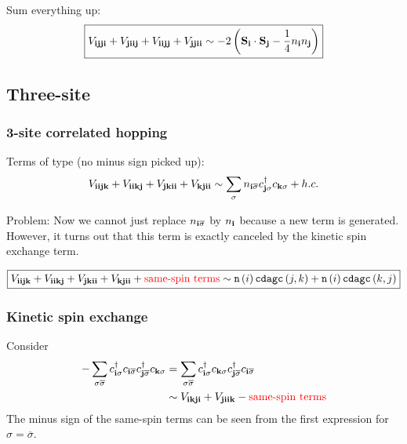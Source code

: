 \documentclass[12pt,paper=a4]{article}
\newcommand{\cs}[1]{c_{#1\sigma}}
\newcommand{\cdags}[1]{c^{\dagger}_{#1\sigma}}
\newcommand{\cS}[1]{c_{#1\overline{\sigma}}}
\newcommand{\cdagS}[1]{c^{\dagger}_{#1\overline{\sigma}}}
\begin{document}
Sum everything up:
\begin{equation}
\boxed{ V_{\mathbf{ijji}} + V_{\mathbf{jiij}} + V_{\mathbf{iijj}} + V_{\mathbf{jjii}} 
\sim -2\left( \mathbf{S}_{\mathbf{i}}\cdot \mathbf{S}_{\mathbf{j}} - \frac{1}{4} n_{\mathbf{i}}n_{\mathbf{j}} \right)
}
\end{equation}

\subsection{Three-site}

\subsubsection{3-site correlated hopping}

Terms of type (no minus sign picked up):
\begin{equation}
V_{\v{iijk}} + V_{\v{iikj}} + V_{\v{jkii}} + V_{\v{kjii}} \sim \sum_{\sigma} n_{\v{i}\overline{\sigma}} \cdags{\v{j}}\cs{\v{k}} + h.c.
\end{equation}

Problem: Now we cannot just replace $n_{\mathbf{i}\overline{\sigma}}$ by $n_{\mathbf{i}}$ because a new term is generated. However, it turns out that this term is exactly canceled by the kinetic spin exchange term.

\begin{equation}
\boxed{ V_{\mathbf{iijk}} + V_{\mathbf{iikj}} + V_{\mathbf{jkii}} + V_{\mathbf{kjii}} + {\color{red}\text{same-spin terms}} \sim \mathtt{n}\left(i\right) \mathtt{cdagc}\left(j,k\right) + \mathtt{n}\left(i\right) \mathtt{cdagc}\left(k,j\right) 
}
\end{equation}

\subsubsection{Kinetic spin exchange}

Consider
\begin{equation}
\begin{split}
-\sum_{\sigma\overline{\sigma}} \cdags{\v{i}} \cS{\v{i}} \cdagS{\v{j}} \cs{\v{k}} 
&= \sum_{\sigma\overline{\sigma}} \cdags{\v{i}} \cs{\v{k}} \cdagS{\v{j}} \cS{\v{i}} \\
&\sim V_{\v{ikji}} + V_{\v{jiik}} - {\color{red}\text{same-spin terms}}
\end{split}
\end{equation}
The minus sign of the same-spin terms can be seen from the first expression for $\sigma=\overline{\sigma}$.
\end{document}
